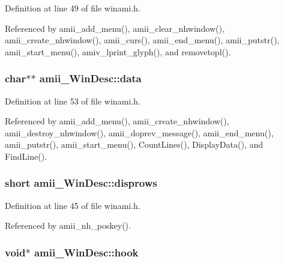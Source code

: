 Definition at line 49 of file winami.\+h.



Referenced by amii\+\_\+add\+\_\+menu(), amii\+\_\+clear\+\_\+nhwindow(), amii\+\_\+create\+\_\+nhwindow(), amii\+\_\+curs(), amii\+\_\+end\+\_\+menu(), amii\+\_\+putstr(), amii\+\_\+start\+\_\+menu(), amiv\+\_\+lprint\+\_\+glyph(), and removetopl().

\hypertarget{structamii__WinDesc_a1be96ba5842aef93cb36e73173277ad6}{
\subsubsection[{data}]{\setlength{\rightskip}{0pt plus 5cm}char$\ast$$\ast$ amii\+\_\+\+Win\+Desc\+::data}}\label{structamii__WinDesc_a1be96ba5842aef93cb36e73173277ad6}


Definition at line 53 of file winami.\+h.



Referenced by amii\+\_\+add\+\_\+menu(), amii\+\_\+create\+\_\+nhwindow(), amii\+\_\+destroy\+\_\+nhwindow(), amii\+\_\+doprev\+\_\+message(), amii\+\_\+end\+\_\+menu(), amii\+\_\+putstr(), amii\+\_\+start\+\_\+menu(), Count\+Lines(), Display\+Data(), and Find\+Line().

\hypertarget{structamii__WinDesc_ad73ea3210d2bf3840205b8a4b720f13d}{
\subsubsection[{disprows}]{\setlength{\rightskip}{0pt plus 5cm}short amii\+\_\+\+Win\+Desc\+::disprows}}\label{structamii__WinDesc_ad73ea3210d2bf3840205b8a4b720f13d}


Definition at line 45 of file winami.\+h.



Referenced by amii\+\_\+nh\+\_\+poskey().

\hypertarget{structamii__WinDesc_a95adbcba37257f02f7d9b3e5ef4c8411}{
\subsubsection[{hook}]{\setlength{\rightskip}{0pt plus 5cm}void$\ast$ amii\+\_\+\+Win\+Desc\+::hook}}\label{structamii__WinDesc_a95adbcba37257f02f7d9b3e5ef4c8411}


